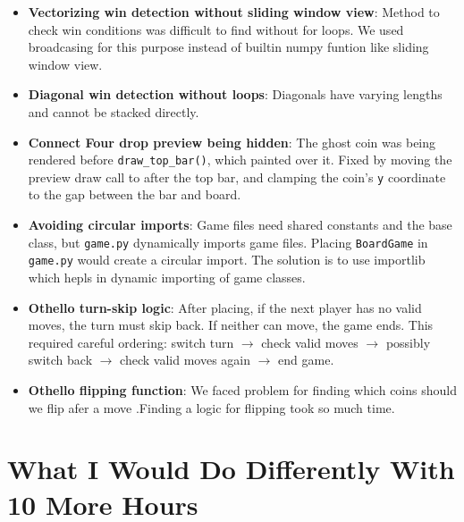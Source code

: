 \documentclass[12pt, letterpaper]{article}
\begin{document}
\begin{itemize}
    \item \textbf{Vectorizing win detection without sliding window view}:
          Method to check win conditions was difficult to find without for loops. We used broadcasing for this purpose instead of builtin numpy funtion like sliding window view.

    \item \textbf{Diagonal win detection without loops}:
          Diagonals have varying lengths and cannot be stacked directly.

    \item \textbf{Connect Four drop preview being hidden}:
          The ghost coin was being rendered before \texttt{draw\_top\_bar()},
          which painted over it. Fixed by moving the preview draw call to
          after the top bar, and clamping the coin's \texttt{y} coordinate
          to the gap between the bar and board.

    \item \textbf{Avoiding circular imports}:
          Game files need shared constants and the base class, but
          \texttt{game.py} dynamically imports game files. Placing
          \texttt{BoardGame} in \texttt{game.py} would create a circular
          import. The solution is to use importlib which hepls in dynamic importing of game classes.

    \item \textbf{Othello turn-skip logic}:
          After placing, if the next player has no valid moves, the turn must
          skip back. If neither can move, the game ends. This required careful
          ordering: switch turn $\to$ check valid moves $\to$ possibly switch
          back $\to$ check valid moves again $\to$ end game.

    \item \textbf{Othello flipping function}:
          We faced problem for finding which coins should we flip afer a move .Finding a logic for flipping took so much time.
\end{itemize}

\section{What I Would Do Differently With 10 More Hours}
\end{document}
